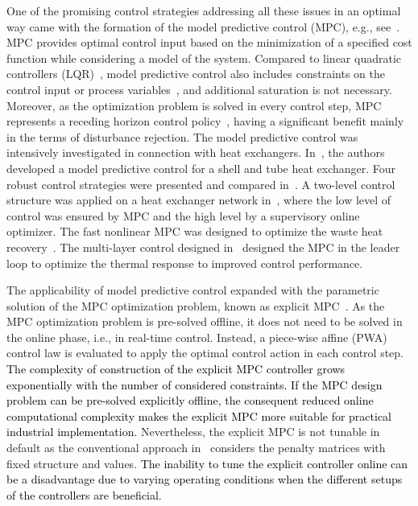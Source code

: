 \documentclass[preprint,12pt]{elsarticle}
\newcommand{\change}[1]{\textcolor{black}{#1}}
\begin{document}
	One of the promising control strategies addressing all these issues in an optimal way came with the formation of the model predictive control (MPC), e.g., see~\cite{Morari_MPC}. MPC provides optimal control input based on the minimization of a specified cost function while considering a model of the system. Compared to linear quadratic controllers (LQR)~\cite{LQR}, model predictive control also includes constraints on the control input or process variables~\cite{Maciejowski_MPC}, and additional saturation is not necessary. Moreover, as the optimization problem is solved in every control step, MPC represents a receding horizon control policy~\cite{receding_horizon}, having a significant benefit mainly in the terms of disturbance rejection. The model predictive control was intensively investigated in connection with heat exchangers. In~\cite{Vinaya_HE_MPC}, the authors developed a model predictive control for a shell and tube heat exchanger. %
	Four robust control strategies were presented and compared in~\cite{Oravec_HE_ATE}. A two-level control structure was applied on a heat exchanger network in~\cite{Gonzales_HE_MPC}, where the low level of control was ensured by MPC and the high level by a supervisory online optimizer. The fast nonlinear MPC was designed to optimize the waste heat recovery~\cite{WC19}. The multi-layer control designed in~\cite{DZ18} designed the MPC in the leader loop to optimize the thermal response to improved control performance. %
	
	The applicability of model predictive control expanded with the parametric solution of the MPC optimization problem, known as explicit MPC~\cite{Bemporad_automatica}. As the MPC optimization problem is pre-solved offline, it does not need to be solved in the online phase, i.e., in real-time control. Instead, a piece-wise affine (PWA) control law is evaluated to apply the optimal control action in each control step.
	\change{The complexity of construction of the explicit MPC controller grows exponentially with the number of considered constraints. If the MPC design problem can be pre-solved explicitly offline, the consequent reduced online computational complexity makes the explicit MPC more suitable for practical industrial implementation.} Nevertheless, the explicit MPC is not tunable in default as the conventional approach in~\cite{Bemporad_automatica} considers the penalty matrices with fixed structure and values. \change{The inability to tune the explicit controller online can be a disadvantage due to varying operating conditions when the different setups of the controllers are beneficial.}
	
\end{document}
